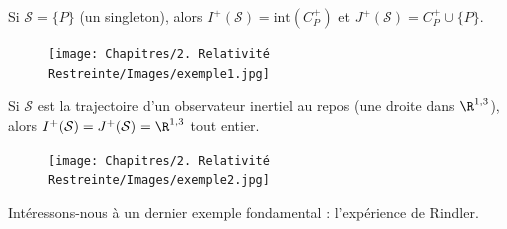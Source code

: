 {\begin{exmp}
    Si $\mathcal{S} = \{P\}$ (un singleton), alors $I^{+}(\mathcal{S}) = \mathrm{int}( C_{P}^{+})$ et $J^{+}(\mathcal{S}) = C_{P}^{+} \cup \{P\}$. 
\begin{figure}[H]
    \centering
    \texttt{[image: Chapitres/2. Relativité Restreinte/Images/exemple1.jpg]}
    \caption{}
    \label{fig:2.6}
\end{figure}
\end{exmp}

    \begin{exmp}
    Si $\mathcal{S}$ est la trajectoire d'un observateur inertiel au repos (une droite dans $\R^{1,3}$), alors $I^{+}(\mathcal{S}) = J^{+}(\mathcal{S}) = \R^{1,3}$ tout entier.
    \begin{figure}[H]
        \centering
        \texttt{[image: Chapitres/2. Relativité Restreinte/Images/exemple2.jpg]}
        \caption{}
        \label{fig:2.7}
    \end{figure}
\end{exmp}
Intéressons-nous à un dernier exemple fondamental : l'expérience de Rindler.

}
